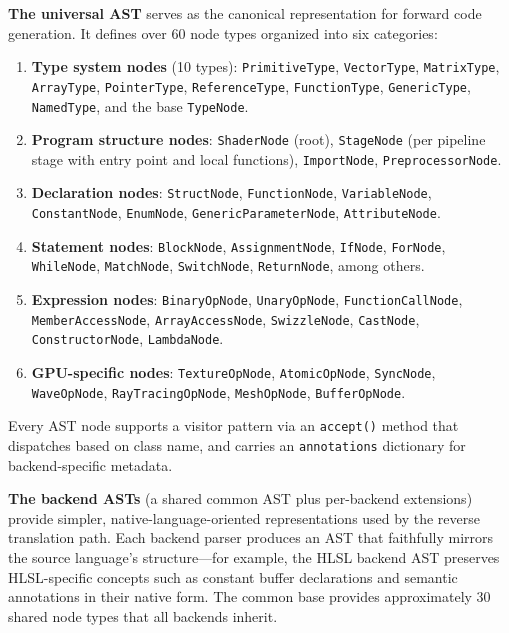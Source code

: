 \documentclass{svproc}
\begin{document}
\textbf{The universal AST} serves as the canonical representation for forward code generation. It defines over 60 node types organized into six categories:

\begin{enumerate}
\item \textbf{Type system nodes} (10 types): \texttt{PrimitiveType}, \texttt{VectorType}, \texttt{MatrixType}, \texttt{ArrayType}, \texttt{PointerType}, \texttt{ReferenceType}, \texttt{FunctionType}, \texttt{GenericType}, \texttt{NamedType}, and the base \texttt{TypeNode}.
\item \textbf{Program structure nodes}: \texttt{ShaderNode} (root), \texttt{StageNode} (per pipeline stage with entry point and local functions), \texttt{ImportNode}, \texttt{PreprocessorNode}.
\item \textbf{Declaration nodes}: \texttt{StructNode}, \texttt{FunctionNode}, \texttt{VariableNode}, \texttt{ConstantNode}, \texttt{EnumNode}, \texttt{GenericParameterNode}, \texttt{AttributeNode}.
\item \textbf{Statement nodes}: \texttt{BlockNode}, \texttt{AssignmentNode}, \texttt{IfNode}, \texttt{ForNode}, \texttt{WhileNode}, \texttt{MatchNode}, \texttt{SwitchNode}, \texttt{ReturnNode}, among others.
\item \textbf{Expression nodes}: \texttt{BinaryOpNode}, \texttt{UnaryOpNode}, \texttt{FunctionCallNode}, \texttt{MemberAccessNode}, \texttt{ArrayAccessNode}, \texttt{SwizzleNode}, \texttt{CastNode}, \texttt{ConstructorNode}, \texttt{LambdaNode}.
\item \textbf{GPU-specific nodes}: \texttt{TextureOpNode}, \texttt{AtomicOpNode}, \texttt{SyncNode}, \texttt{WaveOpNode}, \texttt{RayTracingOpNode}, \texttt{MeshOpNode}, \texttt{BufferOpNode}.
\end{enumerate}

Every AST node supports a visitor pattern via an \texttt{accept()} method that dispatches based on class name, and carries an \texttt{annotations} dictionary for backend-specific metadata.

\textbf{The backend ASTs} (a shared common AST plus per-backend extensions) provide simpler, native-language-oriented representations used by the reverse translation path. Each backend parser produces an AST that faithfully mirrors the source language's structure---for example, the HLSL backend AST preserves HLSL-specific concepts such as constant buffer declarations and semantic annotations in their native form. The common base provides approximately 30 shared node types that all backends inherit.
\end{document}
